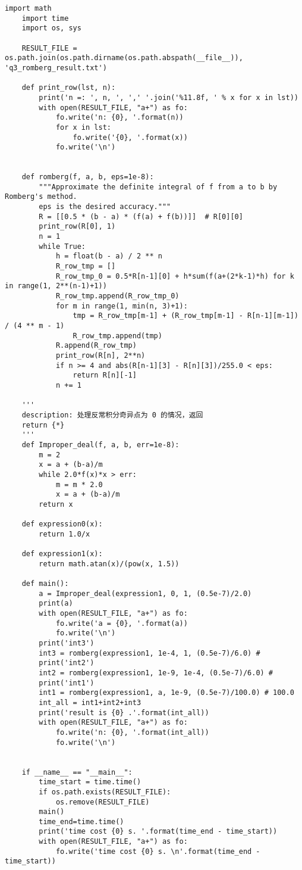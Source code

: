 \begin{lstlisting}[style = python]
    import math
    import time
    import os, sys
    
    RESULT_FILE = os.path.join(os.path.dirname(os.path.abspath(__file__)), 'q3_romberg_result.txt')
    
    def print_row(lst, n):
        print('n =: ', n, ', ',' '.join('%11.8f, ' % x for x in lst))
        with open(RESULT_FILE, "a+") as fo:
            fo.write('n: {0}, '.format(n))
            for x in lst:
                fo.write('{0}, '.format(x))
            fo.write('\n')
    
    
    def romberg(f, a, b, eps=1e-8):
        """Approximate the definite integral of f from a to b by Romberg's method.
        eps is the desired accuracy."""
        R = [[0.5 * (b - a) * (f(a) + f(b))]]  # R[0][0]
        print_row(R[0], 1)
        n = 1
        while True:
            h = float(b - a) / 2 ** n
            R_row_tmp = []
            R_row_tmp_0 = 0.5*R[n-1][0] + h*sum(f(a+(2*k-1)*h) for k in range(1, 2**(n-1)+1))
            R_row_tmp.append(R_row_tmp_0)
            for m in range(1, min(n, 3)+1):
                tmp = R_row_tmp[m-1] + (R_row_tmp[m-1] - R[n-1][m-1]) / (4 ** m - 1)
                R_row_tmp.append(tmp)
            R.append(R_row_tmp)
            print_row(R[n], 2**n)
            if n >= 4 and abs(R[n-1][3] - R[n][3])/255.0 < eps:
                return R[n][-1]
            n += 1
    
    '''
    description: 处理反常积分奇异点为 0 的情况，返回
    return {*} 
    '''
    def Improper_deal(f, a, b, err=1e-8):
        m = 2
        x = a + (b-a)/m
        while 2.0*f(x)*x > err:
            m = m * 2.0
            x = a + (b-a)/m
        return x
    
    def expression0(x):
        return 1.0/x
    
    def expression1(x):
        return math.atan(x)/(pow(x, 1.5))
    
    def main():
        a = Improper_deal(expression1, 0, 1, (0.5e-7)/2.0)
        print(a)
        with open(RESULT_FILE, "a+") as fo:
            fo.write('a = {0}, '.format(a))
            fo.write('\n')
        print('int3')
        int3 = romberg(expression1, 1e-4, 1, (0.5e-7)/6.0) # 
        print('int2')
        int2 = romberg(expression1, 1e-9, 1e-4, (0.5e-7)/6.0) #
        print('int1')
        int1 = romberg(expression1, a, 1e-9, (0.5e-7)/100.0) # 100.0
        int_all = int1+int2+int3
        print('result is {0} .'.format(int_all))
        with open(RESULT_FILE, "a+") as fo:
            fo.write('n: {0}, '.format(int_all))
            fo.write('\n')
    
    
    if __name__ == "__main__":
        time_start = time.time()
        if os.path.exists(RESULT_FILE):
            os.remove(RESULT_FILE)
        main()
        time_end=time.time()
        print('time cost {0} s. '.format(time_end - time_start))
        with open(RESULT_FILE, "a+") as fo:
            fo.write('time cost {0} s. \n'.format(time_end - time_start))
\end{lstlisting}

